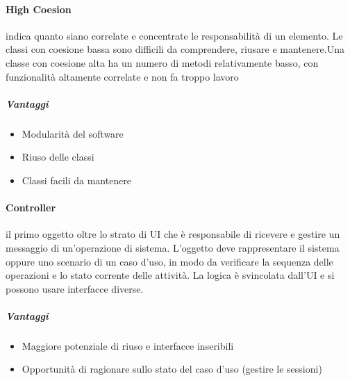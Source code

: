 \documentclass[12pt]{article}
\begin{document}
\paragraph{High Coesion} indica quanto siano correlate e concentrate le responsabilità di un elemento. Le classi con coesione bassa sono difficili da comprendere, riusare e mantenere.Una classe con coesione alta ha un numero di metodi relativamente basso, con funzionalità altamente correlate e non fa troppo lavoro
\subparagraph{Vantaggi}
\begin{itemize}
    \item Modularità del software
    \item Riuso delle classi
    \item Classi facili da mantenere
\end{itemize}
\newpage
\paragraph{Controller} il primo oggetto oltre lo strato di UI che è responsabile di ricevere e gestire un messaggio di un’operazione di sistema. L’oggetto deve rappresentare il sistema oppure uno scenario di un caso d’uso, in modo da verificare la sequenza delle operazioni e lo stato corrente delle attività. La logica è svincolata dall’UI e si possono usare interfacce diverse.
\subparagraph{Vantaggi}
\begin{itemize}
    \item Maggiore potenziale di riuso e interfacce inseribili
    \item Opportunità di ragionare sullo stato del caso d'uso (gestire le sessioni)
\end{itemize}
\end{document}
